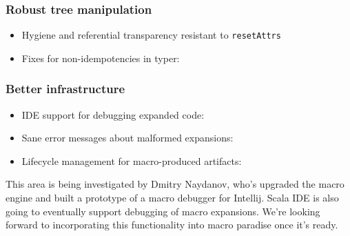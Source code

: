 \documentclass[svgnames,hyperref={bookmarks=false}]{beamer}
\begin{document}
\begin{frame}[fragile]
\frametitle{}

\vskip40pt
\begin{center}
\end{center}
\end{frame}

\begin{frame}[fragile]
\frametitle{Robust tree manipulation}

\begin{itemize}
\item Hygiene and referential transparency resistant to \texttt{resetAttrs}
\item Fixes for non-idempotencies in typer: 
\end{itemize}
\end{frame}

\begin{frame}[fragile]
\frametitle{Better infrastructure}

\begin{itemize}
\item IDE support for debugging expanded code: 
\item Sane error messages about malformed expansions: 
\item Lifecycle management for macro-produced artifacts: 
\end{itemize}

This area is being investigated by Dmitry Naydanov, who's upgraded the macro engine and built a prototype of a macro debugger for Intellij. Scala IDE is also going to eventually support debugging of macro expansions. We're looking forward to incorporating this functionality into macro paradise once it's ready.
\end{frame}
\end{document}
